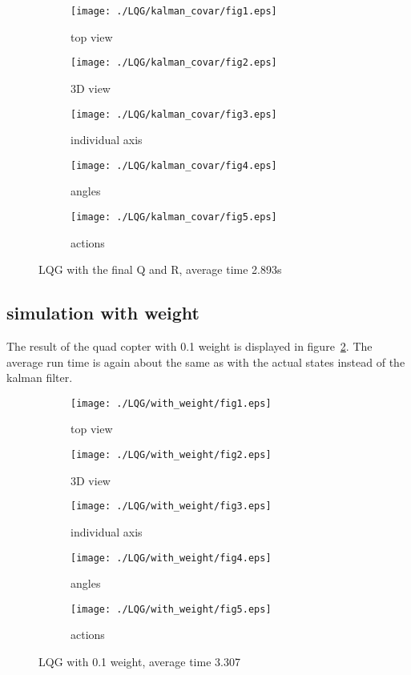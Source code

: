 \begin{figure}[H]
	\centering
	\begin{subfigure}[b]{0.3\textwidth}
		\texttt{[image: ./LQG/kalman\_covar/fig1.eps]}
		\caption{top view}
	\end{subfigure}
	\begin{subfigure}[b]{0.3\textwidth}
		\texttt{[image: ./LQG/kalman\_covar/fig2.eps]}
		\caption{3D view}
	\end{subfigure}
	\begin{subfigure}[b]{0.3\textwidth}
		\texttt{[image: ./LQG/kalman\_covar/fig3.eps]}
		\caption{individual axis}
	\end{subfigure}
	\begin{subfigure}[b]{0.3\textwidth}
		\texttt{[image: ./LQG/kalman\_covar/fig4.eps]}
		\caption{angles}
	\end{subfigure}
	\begin{subfigure}[b]{0.3\textwidth}
		\texttt{[image: ./LQG/kalman\_covar/fig5.eps]}
		\caption{actions}
	\end{subfigure}
	\caption{LQG with the final Q and R, average time 2.893s}\label{fig:LQG without weight final}
\end{figure}


\subsection{simulation with weight}
The result of the quad copter with 0.1 weight is displayed in figure~\ref{fig:LQG with weight}. The average run time is again about the same as with the actual states instead of the kalman filter. 
\begin{figure}[H]
	\centering
	\begin{subfigure}[b]{0.3\textwidth}
		\texttt{[image: ./LQG/with\_weight/fig1.eps]}
		\caption{top view}
	\end{subfigure}
	\begin{subfigure}[b]{0.3\textwidth}
		\texttt{[image: ./LQG/with\_weight/fig2.eps]}
		\caption{3D view}
	\end{subfigure}
	\begin{subfigure}[b]{0.3\textwidth}
		\texttt{[image: ./LQG/with\_weight/fig3.eps]}
		\caption{individual axis}
	\end{subfigure}
	\begin{subfigure}[b]{0.3\textwidth}
		\texttt{[image: ./LQG/with\_weight/fig4.eps]}
		\caption{angles}
	\end{subfigure}
	\begin{subfigure}[b]{0.3\textwidth}
		\texttt{[image: ./LQG/with\_weight/fig5.eps]}
		\caption{actions}
	\end{subfigure}
	\caption{LQG with 0.1 weight, average time 3.307}\label{fig:LQG with weight}
\end{figure}